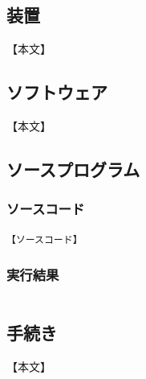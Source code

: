 \documentclass[a4paper, papersize]{jsarticle}
\begin{document}
\begin{multicols}{2}

\subsection{装置}
【本文】


\subsection{ソフトウェア}
【本文】


\subsection{ソースプログラム}


\subsubsection{ソースコード}

\setcounter{lstlisting}{4}
\renewcommand{\lstlistingname}{ソースコード}
\begin{lstlisting}[caption = 【ファイル名】, label=【参照名】]
【ソースコード】
\end{lstlisting}


\setcounter{lstlisting}{2}
\renewcommand{\lstlistingname}{実行結果}
\subsubsection{実行結果}
\setcounter{lstlisting}{0}
\renewcommand{\lstlistingname}{実行結果}
\begin{lstlisting}[caption = 【ファイル名】 \quad 【ファイル名】, label = 【参照名】]
\end{lstlisting}


\subsection{手続き}
【本文】



\end{multicols}
\end{document}
